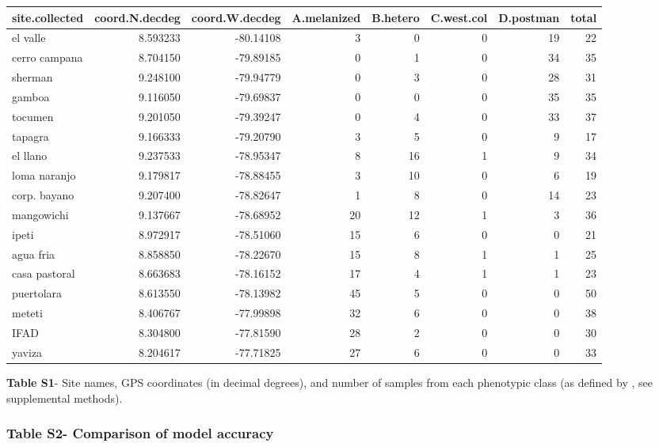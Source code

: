 \documentclass[]{article}
\begin{document}
\begin{table}[H]
\centering
\begin{tabular}{lrrrrrrr}
\toprule
site.collected & coord.N.decdeg & coord.W.decdeg & A.melanized & B.hetero & C.west.col & D.postman & total\\
\midrule
el valle & 8.593233 & -80.14108 & 3 & 0 & 0 & 19 & 22\\
cerro campana & 8.704150 & -79.89185 & 0 & 1 & 0 & 34 & 35\\
sherman & 9.248100 & -79.94779 & 0 & 3 & 0 & 28 & 31\\
gamboa & 9.116050 & -79.69837 & 0 & 0 & 0 & 35 & 35\\
tocumen & 9.201050 & -79.39247 & 0 & 4 & 0 & 33 & 37\\
\addlinespace
tapagra & 9.166333 & -79.20790 & 3 & 5 & 0 & 9 & 17\\
el llano & 9.237533 & -78.95347 & 8 & 16 & 1 & 9 & 34\\
loma naranjo & 9.179817 & -78.88455 & 3 & 10 & 0 & 6 & 19\\
corp. bayano & 9.207400 & -78.82647 & 1 & 8 & 0 & 14 & 23\\
mangowichi & 9.137667 & -78.68952 & 20 & 12 & 1 & 3 & 36\\
\addlinespace
ipeti & 8.972917 & -78.51060 & 15 & 6 & 0 & 0 & 21\\
agua fria & 8.858850 & -78.22670 & 15 & 8 & 1 & 1 & 25\\
casa pastoral & 8.663683 & -78.16152 & 17 & 4 & 1 & 1 & 23\\
puertolara & 8.613550 & -78.13982 & 45 & 5 & 0 & 0 & 50\\
meteti & 8.406767 & -77.99898 & 32 & 6 & 0 & 0 & 38\\
\addlinespace
IFAD & 8.304800 & -77.81590 & 28 & 2 & 0 & 0 & 30\\
yaviza & 8.204617 & -77.71825 & 27 & 6 & 0 & 0 & 33\\
\bottomrule
\end{tabular}
\end{table}

\textbf{Table S1}- Site names, GPS coordinates (in decimal degrees), and
number of samples from each phenotypic class (as defined by
\citealt{Mallet:1986vj}, see supplemental methods).

\pagebreak

\subsubsection{Table S2- Comparison of model
accuracy}\label{table-s2--comparison-of-model-accuracy}
\end{document}
